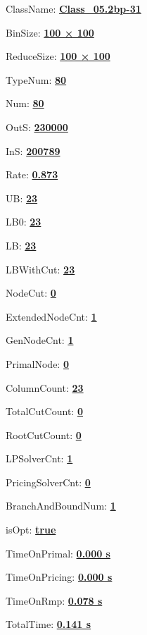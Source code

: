 \documentclass[11pt]{article}
\begin{document}
\pagestyle{empty}


ClassName: \underline{\textbf{Class_05.2bp-31}}
\par
BinSize: \underline{\textbf{100 × 100}}
\par
ReduceSize: \underline{\textbf{100 × 100}}
\par
TypeNum: \underline{\textbf{80}}
\par
Num: \underline{\textbf{80}}
\par
OutS: \underline{\textbf{230000}}
\par
InS: \underline{\textbf{200789}}
\par
Rate: \underline{\textbf{0.873}}
\par
UB: \underline{\textbf{23}}
\par
LB0: \underline{\textbf{23}}
\par
LB: \underline{\textbf{23}}
\par
LBWithCut: \underline{\textbf{23}}
\par
NodeCut: \underline{\textbf{0}}
\par
ExtendedNodeCnt: \underline{\textbf{1}}
\par
GenNodeCnt: \underline{\textbf{1}}
\par
PrimalNode: \underline{\textbf{0}}
\par
ColumnCount: \underline{\textbf{23}}
\par
TotalCutCount: \underline{\textbf{0}}
\par
RootCutCount: \underline{\textbf{0}}
\par
LPSolverCnt: \underline{\textbf{1}}
\par
PricingSolverCnt: \underline{\textbf{0}}
\par
BranchAndBoundNum: \underline{\textbf{1}}
\par
isOpt: \underline{\textbf{true}}
\par
TimeOnPrimal: \underline{\textbf{0.000 s}}
\par
TimeOnPricing: \underline{\textbf{0.000 s}}
\par
TimeOnRmp: \underline{\textbf{0.078 s}}
\par
TotalTime: \underline{\textbf{0.141 s}}
\par
\newpage


\end{document}
